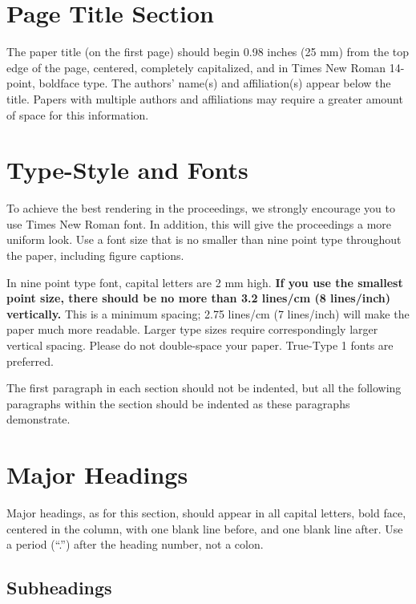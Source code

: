 \documentclass[a4paper,10pt,oneside]{article}
\begin{document}
\begin{sloppy}
\section{Page Title Section}
\label{sec:pagestyle}

The paper title (on the first page) should begin 0.98 inches (25 mm) from the top edge of the page, centered, completely capitalized, and in Times New Roman 14-point, boldface type. The authors' name(s) and affiliation(s) appear below the title. Papers with multiple authors and affiliations may require a greater amount of space for this information.

\section{Type-Style and Fonts}
\label{sec:typestyle}

To achieve the best rendering in the proceedings, we strongly encourage you to use Times New Roman font. In addition, this will give the proceedings a more uniform look. Use a font size that is no smaller than nine point type throughout the paper, including figure captions.

In nine point type font, capital letters are 2 mm high. {\bf If you use the smallest point size, there should be no more than 3.2 lines/cm (8 lines/inch) vertically.} This is a minimum spacing; 2.75 lines/cm (7 lines/inch) will make the paper much more readable. Larger type sizes require correspondingly larger vertical spacing. Please do not double-space your paper. True-Type 1 fonts are preferred.

The first paragraph in each section should not be indented, but all the following paragraphs within the section should be indented as these paragraphs demonstrate.

\section{Major Headings}
\label{sec:majhead}

Major headings, as for this section, should appear in all capital letters, bold face, centered in the column, with one blank line before, and one blank line after. Use a period (``.'') after the heading number, not a colon.

\subsection{Subheadings}
\label{ssec:subhead}


\end{sloppy}
\end{document}
